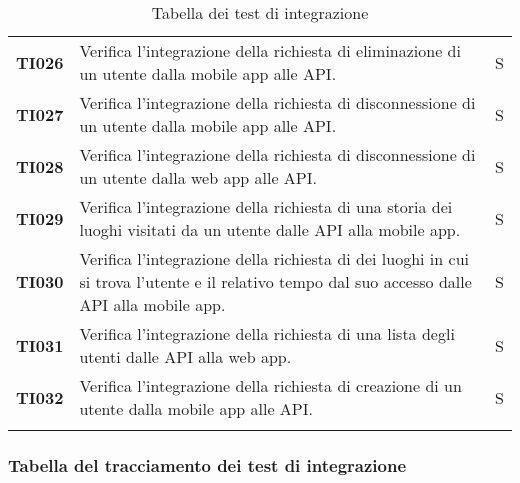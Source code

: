 \documentclass[../../piano-di-qualifica.tex]{subfiles}
\begin{document}
\begin{longtable}[H]{>{\centering\bfseries}m{3cm} >{}m{10cm} >{\centering\arraybackslash}m{3cm}}
  TI026               & Verifica l'integrazione della richiesta di eliminazione di un utente dalla mobile app alle API\@.                                             & S                             \\

  TI027               & Verifica l'integrazione della richiesta di disconnessione di un utente dalla mobile app alle API\@.                                           & S                             \\

  TI028               & Verifica l'integrazione della richiesta di disconnessione di un utente dalla web app alle API\@.                                              & S                             \\

  TI029               & Verifica l'integrazione della richiesta di una storia dei luoghi visitati da un utente dalle API alla mobile app.                             & S                             \\

  TI030               & Verifica l'integrazione della richiesta di dei luoghi in cui si trova l'utente e il relativo tempo dal suo accesso dalle API alla mobile app. & S                             \\

  TI031               & Verifica l'integrazione della richiesta di una lista degli utenti dalle API alla web app.                                                     & S                             \\

  TI032               & Verifica l'integrazione della richiesta di creazione di un utente dalla mobile app alle API\@.                                                & S                             \\

  \rowcolor{white}
  \caption{Tabella dei test di integrazione}%
  \label{tab:test_integrazione}
\end{longtable}

\subsubsection{Tabella del tracciamento dei test di integrazione}%
\label{subsub:tabella_tracciamento_test_di_integrazione}
\end{document}
